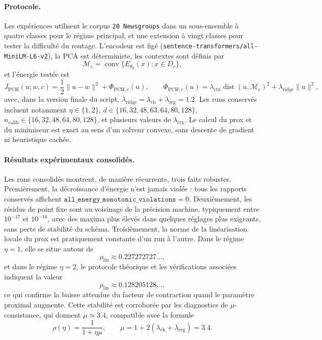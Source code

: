 \paragraph{Protocole.}
Les expériences utilisent le corpus \texttt{20 Newsgroups} dans un sous-ensemble à quatre classes pour le régime principal, et une extension à vingt classes pour tester la difficulté du routage. L’encodeur est figé (\texttt{sentence-transformers/all-MiniLM-L6-v2}), la PCA est déterministe, les contextes sont définis par
\[
\mathcal M_c=\operatorname{conv}\{E_{\theta_0}(x):x\in D_c\},
\]
et l’énergie testée est
\[
J_{\mathrm{PCH}}(u;w,c)=\frac12\|u-w\|^2+\Phi_{\mathrm{PCH},c}(u),
\qquad
\Phi_{\mathrm{PCH},c}(u)=\lambda_{\mathrm{ctx}}\operatorname{dist}(u,\mathcal M_c)^2+\lambda_{\mathrm{ridge}}\|u\|^2,
\]
avec, dans la version finale du script, \(\lambda_{\mathrm{ridge}}=\lambda_{\mathrm{ch}}+\lambda_{\mathrm{reg}}=1.2\). Les runs conservés incluent notamment \(\eta\in\{1,2\}\), \(d\in\{16,32,48,63,64,80,128\}\), \(n_{\mathrm{calib}}\in\{16,32,48,64,80,128\}\), et plusieurs valeurs de \(\lambda_{\mathrm{ctx}}\). Le calcul du prox et du minimiseur est exact au sens d’un solveur convexe, sans descente de gradient ni heuristique cachée.

\paragraph{Résultats expérimentaux consolidés.}
Les runs consolidés montrent, de manière récurrente, trois faits robustes. Premièrement, la décroissance d’énergie n’est jamais violée : tous les rapports conservés affichent \(\texttt{all\_energy\_monotonic\_violations}=0\). Deuxièmement, les résidus de point fixe sont au voisinage de la précision machine, typiquement entre \(10^{-17}\) et \(10^{-16}\), avec des maxima plus élevés dans quelques réglages plus exigeants, sans perte de stabilité du schéma. Troisièmement, la norme de la linéarisation locale du prox est pratiquement constante d’un run à l’autre. Dans le régime \(\eta=1\), elle se situe autour de
\[
\rho_{\mathrm{lin}}\approx 0.227272727\dots,
\]
et dans le régime \(\eta=2\), le protocole théorique et les vérifications associées indiquent la valeur
\[
\rho_{\mathrm{lin}}\approx 0.128205128\dots,
\]
ce qui confirme la baisse attendue du facteur de contraction quand le paramètre proximal augmente. Cette stabilité est corroborée par les diagnostics de \(\mu\)-consistance, qui donnent \(\mu\simeq 3.4\), compatible avec la formule
\[
\rho(\eta)=\frac{1}{1+\eta\mu},
\qquad
\mu=1+2(\lambda_{\mathrm{ch}}+\lambda_{\mathrm{reg}})=3.4.
\]

